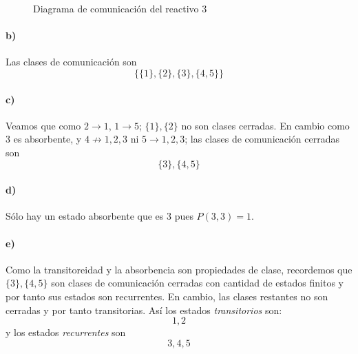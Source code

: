 \documentclass[a4paper,12pt]{article}
\begin{document}
\begin{figure}[!hbt]
\caption{Diagrama de comunicación del reactivo 3} 
\label{fig:p1r3}
\end{figure}
\paragraph{b)} Las clases de comunicación son 
\[\{\{1\},\{2\},\{3\},\{4,5\}\}\]
\paragraph{c)} Veamos que como $2\to 1$, $1\to 5$; $\{1\},\{2\}$ no son clases cerradas. En cambio como $3$ es absorbente, y $4\not\to 1,2,3$ ni $5\to 1,2,3$; las clases de comunicación cerradas son
\[\{3\},\{4,5\}\]
\paragraph{d)} Sólo hay un estado absorbente que es $3$ pues $P(3,3)=1$.
\paragraph{e)} Como la transitoreidad y la absorbencia son propiedades de clase, recordemos que $\{3\},\{4,5\}$ son clases de comunicación cerradas con cantidad de estados finitos y por tanto sus estados son recurrentes. En cambio, las clases restantes no son cerradas y por tanto transitorias. Así los estados \textit{transitorios} son:
\[1,2\]
y los estados \textit{recurrentes} son
\[3,4,5\]
\end{document}
